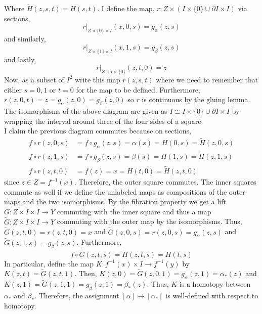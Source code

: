 \documentclass[12pt]{extarticle}
\begin{document}
\begin{center}
\end{center}
Where $\tilde{H}(z, s, t) = H(s, t)$. I define the map, $r : Z \times (I \times \{0\} \cup \partial I \times I)$ via sections, 
\[r|_{Z \times \{0\} \times I}(x, 0, s) = g_{\alpha}(z, s)\] and similarly,
\[r|_{Z \times \{1\} \times I}(x, 1, s) = g_{\beta}(z, s)\]
and lastly,
\[r|_{Z \times I \times \{0\}}(z, t, 0) = z\]
Now, as a subset of $I^2$ write this map $r(z, s, t)$ where we need to remember that either $s = 0,1$ or $t = 0$ for the map to be defined. Furthermore, $r(z, 0, t) = z = g_{\alpha}(z, 0) = g_{\beta}(z, 0)$ so $r$ is continuous by the gluing lemma. The isomorphisms of the above diagram are given as $I \cong I \times \{0\} \cup \partial I \times I$ by wrapping the interval around three of the four sides of a square. 
\bigskip\\
I claim the previous diagram commutes because on sections,
\begin{align*}
f \circ r(z, 0, s) & = f \circ g_{\alpha}(z, s) = \alpha(s) = H(0, s) = \tilde{H}(z, 0, s)
\\
f \circ r(z, 1, s) &= f \circ g_{\beta}(z, s) = \beta(s) = H(1, s) = \tilde{H}(z, 1, s)
\\
f \circ r(z, t, 0) &= f(z) = x = H(t, 0) = \tilde{H}(z, t, 0)
\end{align*}
since $z \in Z = f^{-1}(x)$. Therefore, the outer square commutes. The inner squares commute as well if we define the unlabeled maps  as compositions of the outer maps and the two isomorphisms. By the fibration property we get a lift $G : Z \times I \times I \to Y$ commuting with the inner square and thus a map $\tilde{G} : Z \times I \times I \to Y$ commuting with the outer map by the isomorphisms. Thus, $\tilde{G}(z, t, 0) = r(z, t, 0) = x$ and $\tilde{G}(z, 0, s) = r(z, 0, s) = g_{\alpha}(z, s)$ and $\tilde{G}(z, 1, s) = g_{\beta}(z, s)$. Furthermore, 
\[f \circ \tilde{G}(z, t, s) = \tilde{H}(z, t, s) = H(t, s)\] 
In particular, define the map $K : f^{-1}(x) \times I \to f^{-1}(y)$ by $K(z, t) = \tilde{G}(z, t, 1)$. Then, $K(z, 0) = \tilde{G}(z, 0, 1) = g_{\alpha}(z, 1) = \alpha_*(z)$ and $K(z, 1) = \tilde{G}(z, 1, 1) = g_{\beta}(z, 1) = \beta_*(z)$. Thus, $K$ is a homotopy between $\alpha_*$ and $\beta_*$. Therefore, the assignment $[\alpha] \mapsto [\alpha_*]$ is well-defined with respect to homotopy.
\end{document}
